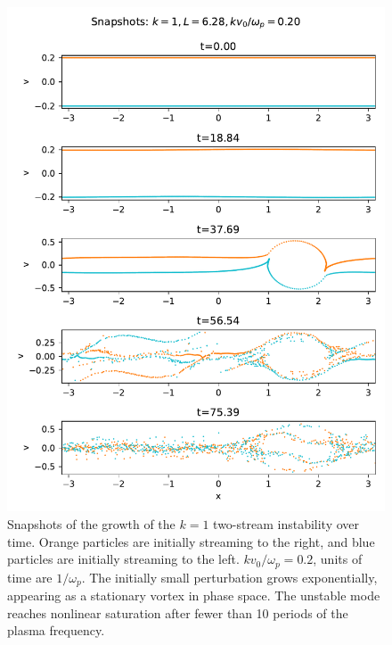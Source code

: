 \documentclass[%
 reprint,
 amsmath,amssymb,
 aps,
]{revtex4-2}
\begin{document}
\begin{figure}
\includegraphics[width=0.9\linewidth]{proj3/two-stream-k=1-snapshots.pdf}
\caption{\label{fig:two-stream-k=1-snapshots}Snapshots of the growth of the $k=1$ two-stream instability over time. Orange particles are initially streaming to the right, and blue particles are initially streaming to the left. $k v_0 / \omega_p = 0.2$, units of time are $1/\omega_p$. The initially small perturbation grows exponentially, appearing as a stationary vortex in phase space. The unstable mode reaches nonlinear saturation after fewer than 10 periods of the plasma frequency.}
\end{figure}
\end{document}
